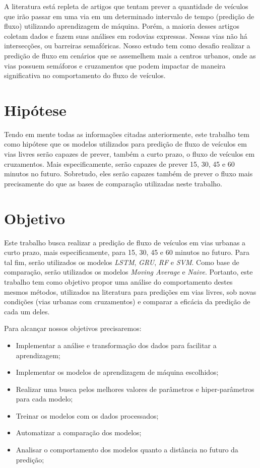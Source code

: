 A literatura está repleta de artigos que tentam prever a quantidade de veículos que irão passar em uma via em um determinado intervalo de tempo (predição de fluxo) utilizando aprendizagem de máquina. Porém, a maioria desses artigos coletam dados e fazem suas análises em rodovias expressas. Nessas vias não há intersecções, ou barreiras semafóricas. Nosso estudo tem como desafio realizar a predição de fluxo em cenários que se assemelhem mais a centros urbanos, onde as vias possuem semáforos e cruzamentos que podem impactar de maneira significativa no comportamento do fluxo de veículos.

\section{Hipótese}

Tendo em mente todas as informações citadas anteriormente, este trabalho tem como hipótese que os modelos utilizados para predição de fluxo de veículos em vias livres serão capazes de prever, também a curto prazo, o fluxo de veículos em cruzamentos. Mais especificamente, serão capazes de prever 15, 30, 45 e 60 minutos no futuro. Sobretudo, eles serão capazes também de prever o fluxo mais precisamente do que as bases de comparação utilizadas neste trabalho.

\section{Objetivo}

Este trabalho busca realizar a predição de fluxo de veículos em vias urbanas a curto prazo, mais especificamente, para 15, 30, 45 e 60 minutos no futuro. Para tal fim, serão utilizados os modelos \textit{\acrfull{LSTM}}, \textit{\acrfull{GRU}}, \textit{\acrfull{RF}} e \textit{\acrfull{SVM}}. Como base de comparação, serão utilizados os modelos \textit{Moving Average} e \textit{Naive}. Portanto, este trabalho tem como objetivo propor uma análise do comportamento destes mesmos métodos, utilizados na literatura para predições em vias livres, sob novas condições (vias urbanas com cruzamentos) e comparar a eficácia da predição de cada um deles.

Para alcançar nossos objetivos precisaremos:

\begin{itemize}
    \item Implementar a análise e transformação dos dados para facilitar a aprendizagem;
    \item Implementar os modelos de aprendizagem de máquina escolhidos; 
    \item Realizar uma busca pelos melhores valores de parâmetros e hiper-parâmetros para cada modelo;
    \item Treinar os modelos com os dados processados;
    \item Automatizar a comparação dos modelos;
    \item Analisar o comportamento dos modelos quanto a distância no futuro da predição;
\end{itemize}


